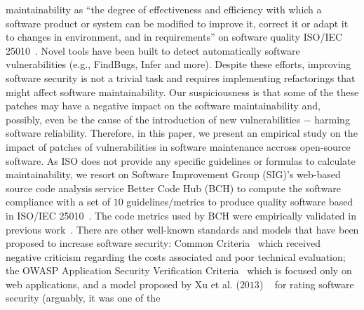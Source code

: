 \documentclass[sigconf,review]{acmart}
\begin{document}
maintainability as ``the degree of effectiveness and
efficiency with which a software product or system can be modified to improve
it, correct it or adapt it to changes in environment, and in requirements'' on
software quality ISO/IEC 25010~\cite{iso:2011}. Novel tools have been built to 
detect automatically software vulnerabilities (e.g., FindBugs, Infer and more). 
%
Despite these efforts, improving software security is not a trivial task and requires 
implementing refactorings that might affect software maintainability. 
Our suspiciousness is that some of the these patches may have a negative 
impact on the software maintainability and, possibly, even be the cause of the 
introduction of new vulnerabilities $-$ harming software reliability. Therefore, 
in this paper, we present an empirical study on the impact of patches of 
vulnerabilities in software maintenance accross open-source software.
%
%
As ISO does not provide any specific guidelines or formulas to calculate 
maintainability, we resort on Software Improvement Group (SIG)'s web-based source 
code analysis service Better Code Hub (BCH) to compute the software compliance 
with a set of $10$ guidelines/metrics to produce quality software 
based in ISO/IEC 25010~\cite{Visser:2016:OREILLY}. The code metrics used by BCH 
were empirically validated in previous work~\cite{Bijlsma:2012:FIR:2317098.2317124, 8530041}. 
There are other well-known standards and models that have been proposed
to increase software security: Common Criteria~\cite{common:2009} which received
negative criticism regarding the costs associated and poor technical evaluation;
the OWASP Application Security Verification Criteria~\cite{oswap:2009} which is
focused only on web applications, and a model proposed by Xu et al. ($2013$)
~\cite{6616351} for rating software security (arguably, it was one of the
\end{document}

